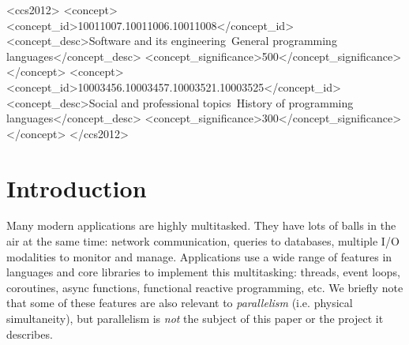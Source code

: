 \documentclass[sigplan,10pt,review,anonymous]{acmart}\settopmatter{printfolios=true,printccs=false,printacmref=false}
\begin{document}
\begin{CCSXML}
<ccs2012>
<concept>
<concept_id>10011007.10011006.10011008</concept_id>
<concept_desc>Software and its engineering~General programming languages</concept_desc>
<concept_significance>500</concept_significance>
</concept>
<concept>
<concept_id>10003456.10003457.10003521.10003525</concept_id>
<concept_desc>Social and professional topics~History of programming languages</concept_desc>
<concept_significance>300</concept_significance>
</concept>
</ccs2012>
\end{CCSXML}




\maketitle




\section{Introduction}

Many modern applications are highly multitasked.
They have lots of balls in the air at the same time: network communication, queries to databases, multiple I/O modalities to monitor and manage.
Applications use a wide range of features in languages and core libraries to implement this multitasking: threads, event loops, coroutines, async functions, functional reactive programming, etc.
We briefly note that some of these features are also relevant to \emph{parallelism} (i.e. physical simultaneity), but parallelism is \emph{not} the subject of this paper or the project it describes.
\end{document}
